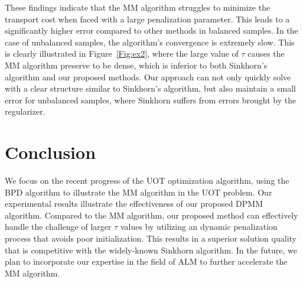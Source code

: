 \documentclass[conference]{IEEEtran}
\begin{document}
These findings indicate that the MM algorithm struggles to minimize the transport cost when faced with a large penalization parameter. This leads to a significantly higher error compared to other methods in balanced samples. In the case of unbalanced samples, the algorithm's convergence is extremely slow. This is clearly illustrated in Figure~\ref{Fig:ex2}, where the large value of $\tau$ causes the MM algorithm preserve to be dense, which is inferior to both Sinkhorn's algorithm and our proposed methods. Our approach can not only quickly solve with a clear structure similar to Sinkhorn's algorithm, but also maintain a small error for unbalanced samples, where Sinkhorn suffers from errors brought by the regularizer.



\section{Conclusion}
We focus on the recent progress of the UOT optimization algorithm, using the BPD algorithm to illustrate the MM algorithm in the UOT problem. Our experimental results illustrate the effectiveness of our proposed DPMM algorithm. Compared to the MM algorithm, our proposed method can effectively handle the challenge of larger $\tau$ values by utilizing an dynamic penalization process that avoids poor initialization. This results in a superior solution quality that is competitive with the widely-known Sinkhorn algorithm. In the future, we plan to incorporate our expertise in the field of ALM to further accelerate the MM algorithm.






\color{red}
\end{document}

